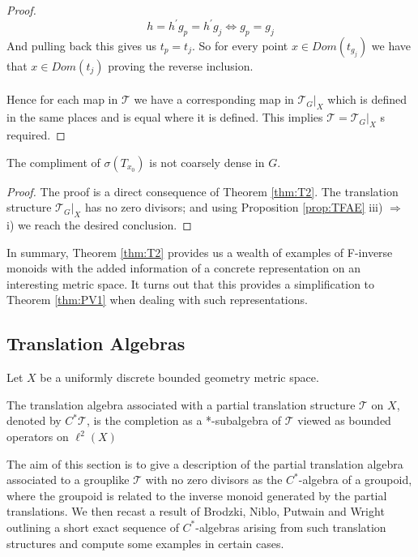 \begin{corollary}
\begin{proof}
\begin{equation}
h=h^{'}g_{p}=h^{'}g_{j} \Leftrightarrow g_{p}=g_{j}
\end{equation}
And pulling back this gives us $t_{p}=t_{j}$. So for every point $x\in Dom(t_{g_{j}})$ we have that $x \in Dom(t_{j})$ proving the reverse inclusion.\\
\\
Hence for each map in $\mathcal{T}$ we have a corresponding map in $\mathcal{T}_{G}|_{X}$ which is defined in the same places and is equal where it is defined. This implies $\mathcal{T}=\mathcal{T}_{G}|_{X}$ s required.
\end{proof}

\begin{corollary}
The compliment of $\sigma (T_{x_{0}})$ is not coarsely dense in $G$.
\end{corollary}
\begin{proof} 
The proof is a direct consequence of Theorem \ref{thm:T2}. The translation structure $\mathcal{T}_{G}|_{X}$ has no zero divisors; and using Proposition \ref{prop:TFAE} iii) $\Rightarrow$ i) we reach the desired conclusion.
\end{proof}

In summary, Theorem \ref{thm:T2} provides us a wealth of examples of F-inverse monoids with the added information of a concrete representation on an interesting metric space. It turns out that this provides a simplification to Theorem \ref{thm:PV1} when dealing with such representations.

\subsection{Translation Algebras}
Let $X$ be a uniformly discrete bounded geometry metric space.

\begin{definition}
The translation algebra associated with a partial translation structure $\mathcal{T}$ on $X$, denoted by $C^{*}\mathcal{T}$, is the completion as a *-subalgebra of $\mathcal{T}$ viewed as bounded operators on $\ell^{2}(X)$
\end{definition}

The aim of this section is to give a description of the partial translation algebra associated to a grouplike $\mathcal{T}$ with no zero divisors as the $C^{*}$-algebra of a groupoid, where the groupoid is related to the inverse monoid generated by the partial translations. We then recast a result of Brodzki, Niblo, Putwain and Wright \cite[Theorem 8.3]{rosiesthesis} outlining a short exact sequence of $C^{*}$-algebras arising from such translation structures and compute some examples in certain cases.


\end{corollary}
